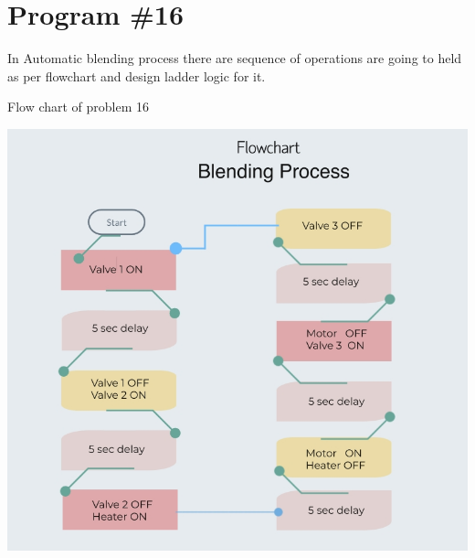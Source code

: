 \documentclass[
	12pt, %
]{fphw}
\begin{document}
 \section*{Program \#16}
 \begin{problem}
  In Automatic blending process there are sequence of operations are going to
  held as per flowchart and design ladder logic for it. \par
  \medskip
  Flow chart of problem 16
  \begin{center}
    \includegraphics[width = 150mm, scale=0.90]{blending1.jpg}
  \end{center}
  \end{problem}
\end{document}
